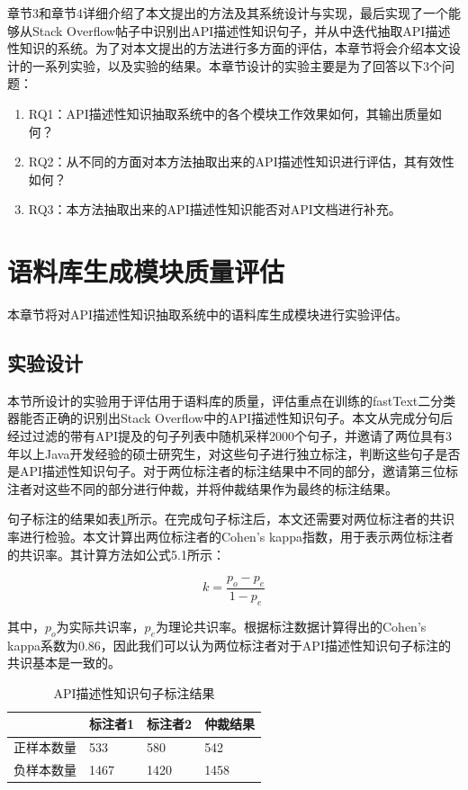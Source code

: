 章节3和章节4详细介绍了本文提出的方法及其系统设计与实现，最后实现了一个能够从Stack Overflow帖子中识别出API描述性知识句子，并从中迭代抽取API描述性知识的系统。为了对本文提出的方法进行多方面的评估，本章节将会介绍本文设计的一系列实验，以及实验的结果。本章节设计的实验主要是为了回答以下3个问题：
\begin{enumerate}
    \item RQ1：API描述性知识抽取系统中的各个模块工作效果如何，其输出质量如何？
    \item RQ2：从不同的方面对本方法抽取出来的API描述性知识进行评估，其有效性如何？
    \item RQ3：本方法抽取出来的API描述性知识能否对API文档进行补充。
\end{enumerate}

\section{语料库生成模块质量评估}
本章节将对API描述性知识抽取系统中的语料库生成模块进行实验评估。

\subsection{实验设计}
本节所设计的实验用于评估用于语料库的质量，评估重点在训练的fastText二分类器能否正确的识别出Stack Overflow中的API描述性知识句子。本文从完成分句后经过过滤的带有API提及的句子列表中随机采样2000个句子，并邀请了两位具有3年以上Java开发经验的硕士研究生，对这些句子进行独立标注，判断这些句子是否是API描述性知识句子。对于两位标注者的标注结果中不同的部分，邀请第三位标注者对这些不同的部分进行仲裁，并将仲裁结果作为最终的标注结果。

句子标注的结果如表\ref{fig:fig1}所示。在完成句子标注后，本文还需要对两位标注者的共识率进行检验。本文计算出两位标注者的Cohen's kappa指数，用于表示两位标注者的共识率。其计算方法如公式5.1所示：

\begin{equation}
    k=\frac{p_{o}-p_{e}}{1-p_{e}}
\end{equation}

其中，$p_{o}$为实际共识率，$p_{e}$为理论共识率。根据标注数据计算得出的Cohen's kappa系数为0.86，因此我们可以认为两位标注者对于API描述性知识句子标注的共识基本是一致的。

\begin{table}[h]
    \centering
    \caption{API描述性知识句子标注结果}
    \label{fig:fig1}
    \begin{tabular}{|l|l|l|l|}
    \hline
          & 标注者1 & 标注者2 & 仲裁结果 \\ \hline
    正样本数量 & 533  & 580  & 542  \\ \hline
    负样本数量 & 1467 & 1420 & 1458 \\ \hline
    \end{tabular}
    \end{table}

